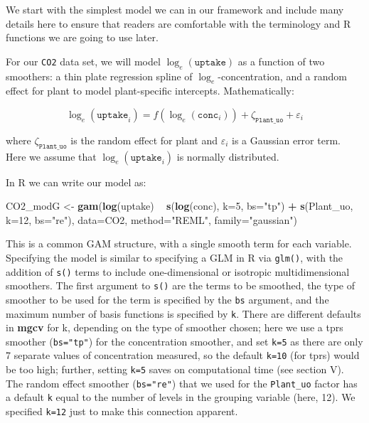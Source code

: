 \documentclass[12pt]{article}
\newenvironment{Shaded}{\begin{snugshade}}{\end{snugshade}}
\newcommand{\KeywordTok}[1]{\textcolor[rgb]{0.13,0.29,0.53}{\textbf{#1}}}
\newcommand{\DataTypeTok}[1]{\textcolor[rgb]{0.13,0.29,0.53}{#1}}
\newcommand{\DecValTok}[1]{\textcolor[rgb]{0.00,0.00,0.81}{#1}}
\newcommand{\StringTok}[1]{\textcolor[rgb]{0.31,0.60,0.02}{#1}}
\newcommand{\OperatorTok}[1]{\textcolor[rgb]{0.81,0.36,0.00}{\textbf{#1}}}
\newcommand{\NormalTok}[1]{#1}
\begin{document}
We start with the simplest model we can in our framework and include
many details here to ensure that readers are comfortable with the
terminology and R functions we are going to use later.

For our \texttt{CO2} data set, we will model \(\log_e(\texttt{uptake})\)
as a function of two smoothers: a thin plate regression spline of
\(\log_e\)-concentration, and a random effect for plant to model
plant-specific intercepts. Mathematically:

\[
\log_e(\texttt{uptake}_i) = f(\log_e(\texttt{conc}_i)) + \zeta_\texttt{Plant\_uo} + \varepsilon_i
\]

where \(\zeta_\texttt{Plant\_uo}\) is the random effect for plant and
\(\varepsilon_i\) is a Gaussian error term. Here we assume that
\(\log_e(\texttt{uptake}_i)\) is normally distributed.

In R we can write our model as:

\begin{Shaded}
\begin{Highlighting}[]
\NormalTok{CO2_modG <-}\StringTok{ }\KeywordTok{gam}\NormalTok{(}\KeywordTok{log}\NormalTok{(uptake) }\OperatorTok{~}\StringTok{ }\KeywordTok{s}\NormalTok{(}\KeywordTok{log}\NormalTok{(conc), }\DataTypeTok{k=}\DecValTok{5}\NormalTok{, }\DataTypeTok{bs=}\StringTok{"tp"}\NormalTok{) }\OperatorTok{+}
\StringTok{                  }\KeywordTok{s}\NormalTok{(Plant_uo, }\DataTypeTok{k=}\DecValTok{12}\NormalTok{, }\DataTypeTok{bs=}\StringTok{"re"}\NormalTok{),}
                \DataTypeTok{data=}\NormalTok{CO2, }\DataTypeTok{method=}\StringTok{"REML"}\NormalTok{, }\DataTypeTok{family=}\StringTok{"gaussian"}\NormalTok{)}
\end{Highlighting}
\end{Shaded}

This is a common GAM structure, with a single smooth term for each
variable. Specifying the model is similar to specifying a GLM in R via
\texttt{glm()}, with the addition of \texttt{s()} terms to include
one-dimensional or isotropic multidimensional smoothers. The first
argument to \texttt{s()} are the terms to be smoothed, the type of
smoother to be used for the term is specified by the \texttt{bs}
argument, and the maximum number of basis functions is specified by
\texttt{k}. There are different defaults in \textbf{mgcv} for k,
depending on the type of smoother chosen; here we use a tprs smoother
(\texttt{bs="tp"}) for the concentration smoother, and set \texttt{k=5}
as there are only 7 separate values of concentration measured, so the
default \texttt{k=10} (for tprs) would be too high; further, setting
\texttt{k=5} saves on computational time (see section V). The random
effect smoother (\texttt{bs="re"}) that we used for the
\texttt{Plant\_uo} factor has a default \texttt{k} equal to the number
of levels in the grouping variable (here, 12). We specified
\texttt{k=12} just to make this connection apparent.
\end{document}
